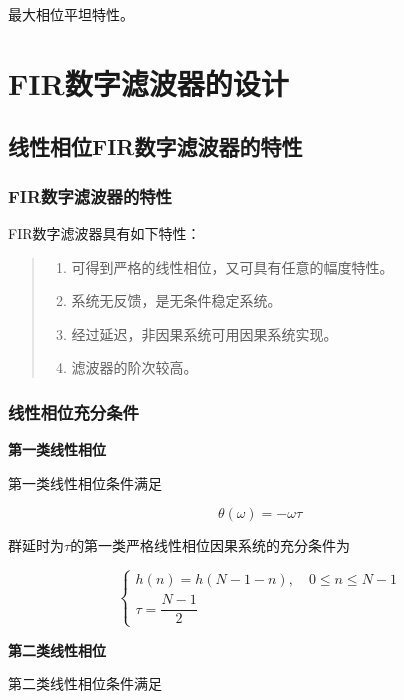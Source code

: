 \documentclass[cn, hazy, blue, normal, 12pt]{elegantnote}
\begin{document}
最大相位平坦特性。

\section{FIR数字滤波器的设计}

\subsection{线性相位FIR数字滤波器的特性}

\subsubsection{FIR数字滤波器的特性}

FIR数字滤波器具有如下特性：

\begin{quote}
\begin{enumerate}
    \item 可得到严格的线性相位，又可具有任意的幅度特性。 
    \item 系统无反馈，是无条件稳定系统。
    \item 经过延迟，非因果系统可用因果系统实现。
    \item 滤波器的阶次较高。
\end{enumerate}
\end{quote}

\subsubsection{线性相位充分条件}

\textbf{第一类线性相位}

第一类线性相位条件满足

\begin{equation}
    \theta(\omega)=-\omega\tau
\end{equation}

群延时为$\tau$的第一类严格线性相位因果系统的充分条件为

\begin{equation}
    \left\{
    \begin{array}{l}
        h(n)=h(N-1-n), \quad 0\leq n\leq N-1 \\
        \tau=\dfrac{N-1}{2}
    \end{array}
    \right.
\end{equation}

\textbf{第二类线性相位}

第二类线性相位条件满足
\end{document}
